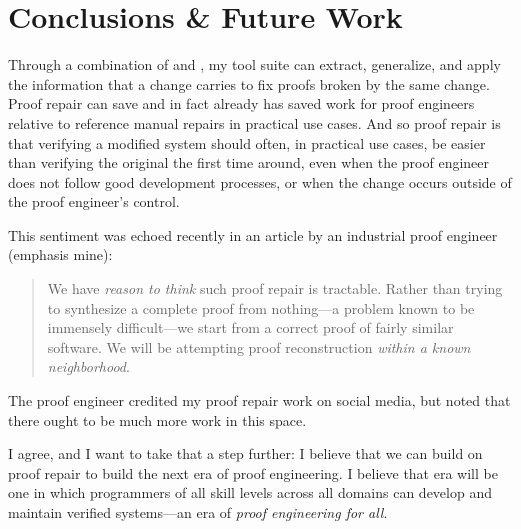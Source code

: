 \chapter{Conclusions \& Future Work}
\label{chapt:conclusions}

Through a combination of  and ,
my  tool suite can extract, generalize, and apply the information that a change carries to fix proofs broken by the same change.
Proof repair can save and in fact already has saved work for proof engineers relative to reference manual repairs in practical use cases.
And so proof repair is  that verifying a modified system should often, in practical use cases, be easier than verifying the original the first time around,
even when the proof engineer does not follow good development processes,
or when the change occurs outside of the proof engineer's control.

This sentiment was echoed recently in an article by an industrial proof engineer~\cite{article} (emphasis mine):

\begin{quote}
We have \textit{reason to think} such proof repair is tractable. Rather than trying to synthesize a complete proof from nothing---a problem known to be immensely difficult---we 
start from a correct proof of fairly similar software. We will be attempting proof reconstruction \textit{within a known neighborhood}.
\end{quote}
The proof engineer credited my proof repair work on social media, %
but noted that there ought to be much more work in this space.

I agree, and I want to take that a step further:
I believe that we can build on proof repair to build the next era of proof engineering.
I believe that era will be one in which programmers of all skill levels across all domains can develop and maintain verified systems---an
era of \textit{proof engineering for all}.


